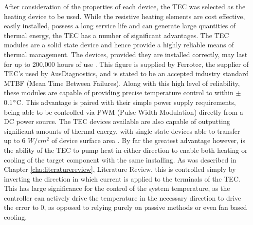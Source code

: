 After consideration of the properties of each device, the TEC was selected as the heating device to be used. While the resistive heating elements are cost effective, easily installed, possess a long service life and can generate large quantities of thermal energy, the TEC has a number of significant advantages. The TEC modules are a solid state device and hence provide a highly reliable means of thermal management. The devices, provided they are installed correctly, may last for up to 200,000 hours of use \cite{Ferroteclife}. This figure is supplied by Ferrotec, the supplier of TEC's used by AusDiagnostics, and is stated to be an accepted industry standard MTBF (Mean Time Between Failures). Along with this high level of reliability, these modules are capable of providing precise temperature control to within $\pm$ 0.1$\degree$C. This advantage is paired with their simple power supply requirements, being able to be controlled via PWM (Pulse Width Modulation) directly from a DC power source. The TEC devices available are also capable of outputting significant amounts of thermal energy, with single state devices able to transfer up to 6 $W/cm^2$ of device surface area \cite{Ferroteclife}. By far the greatest advantage however, is the ability of the TEC to pump heat in either direction to enable both heating or cooling of the target component with the same installing. As was described in Chapter \ref{cha:literaturereview}, Literature Review, this is controlled simply by inverting the direction in which current is applied to the terminals of the TEC. This has large significance for the control of the system temperature, as the controller can actively drive the temperature in the necessary direction to drive the error to 0, as opposed to relying purely on passive methods or even fan based cooling.\\

